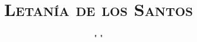 \documentclass[letterpaper,12pt]{article}
\begin{document}
    
    \title{ \textsc{ \bfseries Letanía de los Santos }}
    \date{ " " }
    \maketitle
    
    {%
\parindent 0pt
\noindent
\ifx\preLilyPondExample \undefined
\else
  \expandafter\preLilyPondExample
\fi
\def\lilypondbook{}%

\ifx\postLilyPondExample \undefined
\else
  \expandafter\postLilyPondExample
\fi
} \\
    
    {%
\parindent 0pt
\noindent
\ifx\preLilyPondExample \undefined
\else
  \expandafter\preLilyPondExample
\fi
\def\lilypondbook{}%

\ifx\postLilyPondExample \undefined
\else
  \expandafter\postLilyPondExample
\fi
} \\
    
    {%
\parindent 0pt
\noindent
\ifx\preLilyPondExample \undefined
\else
  \expandafter\preLilyPondExample
\fi
\def\lilypondbook{}%

\ifx\postLilyPondExample \undefined
\else
  \expandafter\postLilyPondExample
\fi
} \\
    
    {%
\parindent 0pt
\noindent
\ifx\preLilyPondExample \undefined
\else
  \expandafter\preLilyPondExample
\fi
\def\lilypondbook{}%

\ifx\postLilyPondExample \undefined
\else
  \expandafter\postLilyPondExample
\fi
}
    
\end{document}
